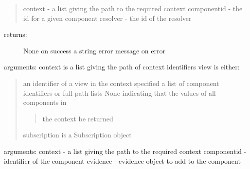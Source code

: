 \documentclass[letterpaper,10pt,english]{sphinxmanual}
\begin{document}
\begin{fulllineitems}
\begin{fulllineitems}
\begin{quote}
context - a list giving the path to the required context
componentid - the id for a given component
resolver - the id of the resolver
\end{quote}
\begin{description}
\item[{returns:}] \leavevmode
None on success
a string error message on error

\end{description}

\end{fulllineitems}


\begin{fulllineitems}
\label{API:personis.client.Access.subscribe}
arguments:
context is a list giving the path of context identifiers
view is either:
\begin{quote}

an identifier of a view in the context specified
a list of component identifiers or full path lists
None indicating that the values of all components in
\begin{quote}

the context be returned
\end{quote}

subscription is a Subscription object
\end{quote}

\end{fulllineitems}


\begin{fulllineitems}
\label{API:personis.client.Access.tell}
arguments:
context - a list giving the path to the required context
componentid - identifier of the component
evidence - evidence object to add to the component

\end{fulllineitems}


\end{fulllineitems}

\end{document}
